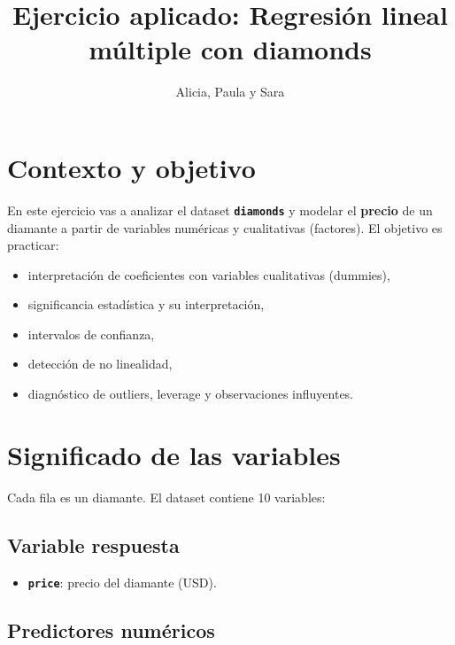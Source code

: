 \documentclass[
  spanish,
]{article}
\title{Ejercicio aplicado: Regresión lineal múltiple con diamonds}
\author{Alicia, Paula y Sara}
\date{}
\providecommand{\tightlist}{%
  \setlength{\itemsep}{0pt}\setlength{\parskip}{0pt}}
\begin{document}
\maketitle

\section{Contexto y objetivo}\label{contexto-y-objetivo}

En este ejercicio vas a analizar el dataset \textbf{\texttt{diamonds}} y
modelar el \textbf{precio} de un diamante a partir de variables
numéricas y cualitativas (factores). El objetivo es practicar:

\begin{itemize}
\tightlist
\item
  interpretación de coeficientes con variables cualitativas (dummies),
\item
  significancia estadística y su interpretación,
\item
  intervalos de confianza,
\item
  detección de no linealidad,
\item
  diagnóstico de outliers, leverage y observaciones influyentes.
\end{itemize}

\section{Significado de las
variables}\label{significado-de-las-variables}

Cada fila es un diamante. El dataset contiene 10 variables:

\subsection{Variable respuesta}\label{variable-respuesta}

\begin{itemize}
\tightlist
\item
  \textbf{\texttt{price}}: precio del diamante (USD).
\end{itemize}

\subsection{Predictores numéricos}\label{predictores-numuxe9ricos}
\end{document}
